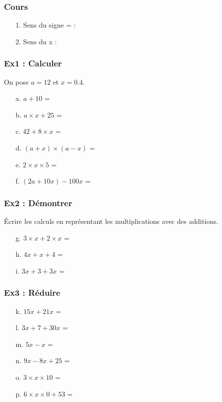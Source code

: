 \subsubsection*{Cours}

\begin{enumerate}
	\item[1.] Sens du signe = : \dotfill 
	\item[2.] Sens du x :  \dotfill  
\end{enumerate}

\subsubsection*{Ex1 : Calculer}

On pose $a = 12$ et $x = 0.4$.

\begin{enumerate}
  \item[a.] $a + 10$ = \dotfill 
  \item[b.] $a \times x + 25$ = \dotfill 
  \item[c.] $42 + 8 \times x$ = \dotfill 
  \item[d.] $(a + x)\times (a - x)$ = \dotfill 
  \item[e.] $2 \times x \times 5$ = \dotfill 
  \item[f.] $(2a + 10x) - 100x$ = \dotfill 
\end{enumerate}

\subsubsection*{Ex2 : Démontrer}

Écrire les calculs en représentant les multiplications avec des additions.

\begin{enumerate}
  \item[g.] $3 \times x + 2 \times x$ = \dotfill 
  \item[h.] $4x + x + 4$ = \dotfill 
  \item[i.] $3x +3 + 3x$ = \dotfill 
\end{enumerate}


\subsubsection*{Ex3 : Réduire}

\begin{enumerate}
  \item[k.] $15x + 21x$ = \dotfill 
  \item[l.] $3x + 7 + 30x$ = \dotfill 
  \item[m.] $5x - x$ = \dotfill 
  \item[n.] $9x - 8x + 25$ = \dotfill 
  \item[o.] $3 \times x \times 10$ = \dotfill 
  \item[p.] $6 \times x \times 0 + 53$ = \dotfill 
\end{enumerate}

